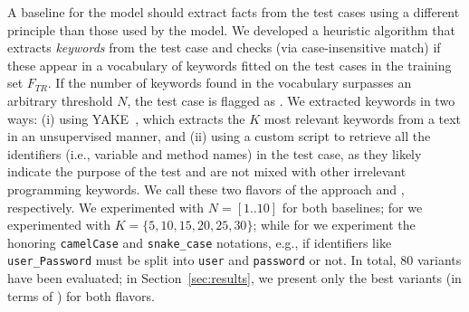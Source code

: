 A baseline for the \finder model should extract facts from the test cases using a different principle than those used by the \finder model.
We developed a heuristic algorithm that extracts \textit{keywords} from the test case and checks (via case-insensitive match) if these appear in a vocabulary of keywords fitted on the test cases in the training set $F_{TR}$.
If the number of keywords found in the vocabulary surpasses an arbitrary threshold $N$, the test case is flagged as \finderPosClass.
We extracted keywords in two ways: (i) using YAKE~\cite{campos:2020:yake}, which extracts the $K$ most relevant keywords from a text in an unsupervised manner, and (ii) using a custom script to retrieve all the identifiers (i.e., variable and method names) in the test case, as they likely indicate the purpose of the test and are not mixed with other irrelevant programming keywords.
We call these two flavors of the approach \yakeVocab and \identVocab, respectively.
We experimented with $N$$=$$[1..10]$ for both baselines; for \yakeVocab we experimented with $K$$=$$\{5,10,15,20,25,30\}$; while for \identVocab we experiment the honoring \texttt{camelCase} and \texttt{snake\_case} notations, e.g., if identifiers like \texttt{user\_Password} must be split into \texttt{user} and \texttt{password} or not.
In total, 80 variants have been evaluated; in Section~\ref{sec:results}, we present only the best variants (in terms of \metricForTest) for both flavors.

